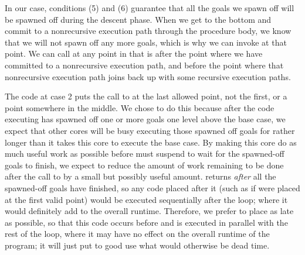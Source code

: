 In our case, conditions (5) and (6) guarantee
that all the goals we spawn off
will be spawned off during the descent phase.
When we get to the bottom and
commit to a nonrecursive execution path through the procedure body,
we know that we will not spawn off any more goals,
which is why we can invoke  at that point.
We can call  at any point in 
that is after the point
where we have committed to a nonrecursive execution path,
and before the point where
that nonrecursive execution path
joins back up with some recursive execution paths.

The code at case 2 puts the call to 
at the last allowed point, not the first, or a point somewhere in the middle.
We chose to do this because after the code executing 
has spawned off one or more goals one level above the base case,
we expect that other cores will be busy executing those spawned off goals
for rather longer than it takes this core to execute the base case.
By making this core do as much useful work as possible
before must suspend to wait for the spawned-off goals to finish,
we expect to reduce the amount of work remaining to be done
after the call to  by a small but possibly useful amount.
 returns \emph{after} all the spawned-off goals have finished,
so any code placed after it
(such as if  were placed at the first valid point)
would be executed sequentially after the loop;
where it would definitely add to the overall runtime.
Therefore, we prefer to place  as late as possible,
so that this code occurs before 
and is executed in parallel with the rest of the loop,
where it may have no effect on the overall runtime of the program;
it will just put to good use what would otherwise be dead time.

